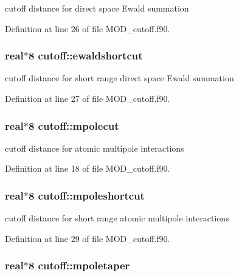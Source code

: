 cutoff distance for direct space Ewald summation 



Definition at line 26 of file M\-O\-D\-\_\-cutoff.\-f90.

\hypertarget{classcutoff_a117f3f3df84668290ed7eb7abe941030}{
\subsubsection[{ewaldshortcut}]{\setlength{\rightskip}{0pt plus 5cm}real$\ast$8 cutoff\-::ewaldshortcut}}\label{classcutoff_a117f3f3df84668290ed7eb7abe941030}


cutoff distance for short range direct space Ewald summation 



Definition at line 27 of file M\-O\-D\-\_\-cutoff.\-f90.

\hypertarget{classcutoff_a976eaa95d9a6a3f903ada6930d43617b}{
\subsubsection[{mpolecut}]{\setlength{\rightskip}{0pt plus 5cm}real$\ast$8 cutoff\-::mpolecut}}\label{classcutoff_a976eaa95d9a6a3f903ada6930d43617b}


cutoff distance for atomic multipole interactions 



Definition at line 18 of file M\-O\-D\-\_\-cutoff.\-f90.

\hypertarget{classcutoff_ab982e131198b9a6e6b13aecf3c2e479f}{
\subsubsection[{mpoleshortcut}]{\setlength{\rightskip}{0pt plus 5cm}real$\ast$8 cutoff\-::mpoleshortcut}}\label{classcutoff_ab982e131198b9a6e6b13aecf3c2e479f}


cutoff distance for short range atomic multipole interactions 



Definition at line 29 of file M\-O\-D\-\_\-cutoff.\-f90.

\hypertarget{classcutoff_ac0a584dd1ffef51acf707a06832a162a}{
\subsubsection[{mpoletaper}]{\setlength{\rightskip}{0pt plus 5cm}real$\ast$8 cutoff\-::mpoletaper}}\label{classcutoff_ac0a584dd1ffef51acf707a06832a162a}


